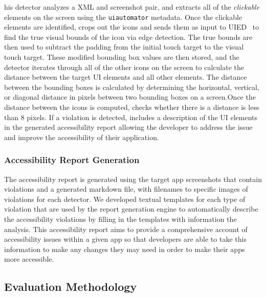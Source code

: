 his detector analyzes a XML and screenshot pair, and extracts all of the \emph{clickable} elements on the screen using the \texttt{\small uiautomator} metadata. Once the clickable elements are identified, \MotorEase crops out the icons and sends them as input to UIED~\cite{UIED} to find the true visual bounds of the icon via edge detection. The true bounds are then used to subtract the padding from the initial touch target to the visual touch target. These modified bounding box values are then stored, and the detector iterates through all of the other icons on the screen to calculate the distance between the target UI elements and all other elements. The distance between the bounding boxes is calculated by determining the horizontal, vertical, or diagonal distance in pixels between two bounding boxes on a screen.Once the distance between the icons is computed, \MotorEase checks whether there is a distance is less than 8 pixels. If a violation is detected, \MotorEase includes a description of the UI elements in the generated accessibility report allowing the developer to address the issue and improve the accessibility of their application.

\subsubsection{Accessibility Report Generation}

The accessibility report is generated using the target app screenshots that contain violations and a generated markdown file, with filenames to specific images of violations for each detector. We developed textual templates for each type of violation that are used by the report generation engine to automatically describe the accessibility violations by filling in the templates with information the \MotorEase analysis. This accessibility report aims to provide a comprehensive account of accessibility issues within a given app so that developers are able to take this information to make any changes they may need in order to make their apps more accessible.


\subsection{Evaluation Methodology}




